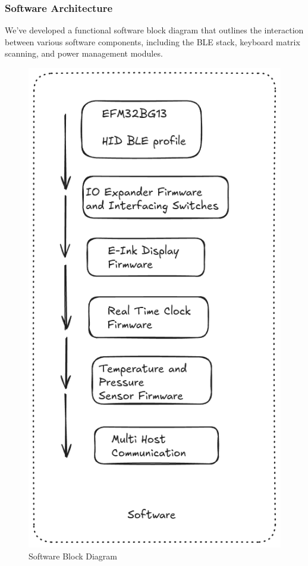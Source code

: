 \documentclass[a4paper,11pt]{article}%
\begin{document}
\subsubsection{Software Architecture}
We've developed a functional software block diagram that outlines the interaction between various software components, including the BLE stack, keyboard matrix scanning, and power management modules.

\begin{figure}[H]
    \centering
    \includegraphics[scale=0.44]{figures/software_diagram.png}
    \caption{Software Block Diagram}
\end{figure}
\end{document}
